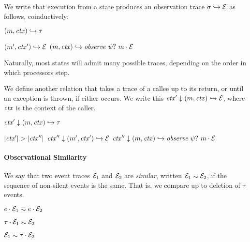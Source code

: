 \documentclass[10pt,conference]{ieeetran}%
\theoremstyle{definition}
\begin{document}
We write that execution from a state produces an observation trace \(\sigma \hookrightarrow \mathcal{E}\)
as follows, coinductively:

         {\((m,\mathit{ctx}) \hookrightarrow \tau\)}

            {\((m',\mathit{ctx}') \hookrightarrow \mathcal{E}\)}
            {\((m,\mathit{ctx}) \hookrightarrow \mathit{observe} ~ \psi? ~ m \cdot \mathcal{E}\)}

Naturally, most states will admit many possible traces, depending on the order in which
processors step.

We define another relation that takes a trace of a callee up to its return, or until
an exception is thrown, if either occurs.
We write this \(\mathit{ctx}' \downarrow (m,\mathit{ctx}) \hookrightarrow \mathcal{E}\), where \(\mathit{ctx}\)
is the context of the caller.

         {\(\mathit{ctx}' \downarrow (m,\mathit{ctx}) \hookrightarrow \tau\)}

                  {\(|\mathit{ctx}'| > |\mathit{ctx}''|\)}
                  {\(\mathit{ctx}'' \downarrow (m',\mathit{ctx}') \hookrightarrow \mathcal{E}\)}
                  {\(\mathit{ctx}'' \downarrow (m,\mathit{ctx}) \hookrightarrow \mathit{observe} ~ \psi? ~ m \cdot \mathcal{E}\)}

\paragraph*{Observational Similarity}

We say that two event traces $\mathcal{E}_1$ and $\mathcal{E}_2$ are {\em similar},
written \(\mathcal{E}_1 \eqsim \mathcal{E}_2\), if the sequence of non-silent events
is the same. That is, we compare up to deletion of \(\tau\) events.

\begin{minipage}{.4\columnwidth}
  \judgment{}{\(\obsT \eqsim \obsT\)}
\end{minipage}
\begin{minipage}{.4\columnwidth}
           {\(e \cdot \mathcal{E}_1 \eqsim e \cdot \mathcal{E}_2\)}
\end{minipage}

\begin{minipage}{.4\columnwidth}
           {\(\tau \cdot \mathcal{E}_1 \eqsim \mathcal{E}_2\)}
\end{minipage}
\begin{minipage}{.4\columnwidth}
           {\(\mathcal{E}_1 \eqsim \tau \cdot \mathcal{E}_2\)}
\end{minipage}
\end{document}

